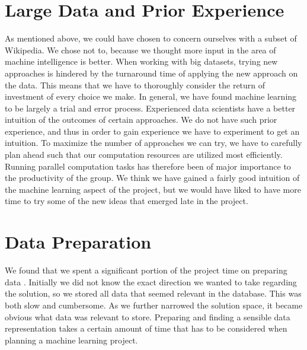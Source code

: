 \section{Large Data and Prior Experience}
As mentioned above, we could have chosen to concern ourselves with a subset of Wikipedia. We chose not to, because we thought more input in the area of machine intelligence is better. When working with big datasets, trying new approaches is hindered by the turnaround time of applying the new approach on the data. This means that we have to thoroughly consider the return of investment of every choice we make. In general, we have found machine learning to be largely a trial and error process. Experienced data scientists have a better intuition of the outcomes of certain approaches. We do not have such prior experience, and thus in order to gain experience we have to experiment to get an intuition. To maximize the number of approaches we can try, we have to carefully plan ahead such that our computation resources are utilized most efficiently. Running parallel computation tasks has therefore been of major importance to the productivity of the group. We think we have gained a fairly good intuition of the machine learning aspect of the project, but we would have liked to have more time to try some of the new ideas that emerged late in the project.  

\section{Data Preparation}
We found that we spent a significant portion of the project time on preparing data . Initially we did not know the exact direction we wanted to take regarding the solution, so we stored all data that seemed relevant in the database. This was both slow and cumbersome. As we further narrowed the solution space, it became obvious what data was relevant to store. Preparing and finding a sensible data representation takes a certain amount of time that has to be considered when planning a machine learning project.

